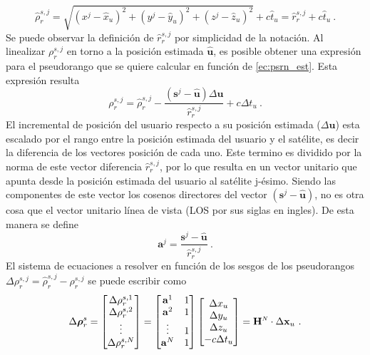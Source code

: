 \documentclass[a4paper,12pt,oneside,onecolumn,final,openright]{book}%
\begin{document}
\begin{equation}\label{ec:psrn_est}
	\hat{\rho}_r^{s,j} = \sqrt{(x^j-\hat{x}_u)^2+(y^j-\hat{y}_u)^2+(z^j-\hat{z}_u)^2} + c\hat{t}_u = \hat{r}_r^{s,j} + c\hat{t}_u \ .
\end{equation}
	Se puede observar la definición de $\hat{r}_r^{s,j}$ por simplicidad de la notación. Al linealizar $\rho_r^{s,j}$ en torno a la posición estimada $\hat{\mathbf{u}}$, es posible obtener una expresión para el pseudorango que se quiere calcular en función de \eqref{ec:psrn_est}. Esta expresión resulta
\begin{equation}
	\rho_r^{s,j} = \hat{\rho}_r^{s,j} - \dfrac{(\mathbf{s}^j - \hat{\mathbf{u}})\Delta \mathbf{u}}{\hat{r}_r^{s,j}} + c\Delta t_u \ .
\end{equation}
	El incremental de posición del usuario respecto a su posición estimada ($\Delta \mathbf{u}$) esta escalado por el rango entre la posición estimada del usuario y el satélite, es decir la diferencia de los vectores posición de cada uno. Este termino es dividido por la norma de este vector diferencia $\hat{r}_r^{s,j}$, por lo que resulta en un vector unitario que apunta desde la posición estimada del usuario al satélite j-ésimo. Siendo las componentes de este vector los cosenos directores del vector $(\mathbf{s}^j - \hat{\mathbf{u}})$, no es otra cosa que el vector unitario línea de vista (LOS por sus siglas en ingles). De esta manera se define
\begin{equation}\label{ec:uLOS}
	\mathbf{a}^j = \dfrac{\mathbf{s}^j-\hat{\mathbf{u}}}{\hat{r}_r^{s,j}} \ .
\end{equation}	
	El sistema de ecuaciones a resolver en función de los sesgos de los pseudorangos $\Delta\rho_r^{s,j} = \hat{\rho}_r^{s,j}-\rho_r^{s,j}$ se puede escribir como
\begin{equation}
	\Delta \boldsymbol{\rho}_r^s = \begin{bmatrix}
\Delta \rho_r^{s,1} \\
\Delta \rho_r^{s,2} \\
\vdots \\
\Delta \rho_r^{s,N} 
\end{bmatrix} = \begin{bmatrix}
\mathbf{a}^1 & 1 \\
\mathbf{a}^2 & 1 \\
\vdots & 1 \\
\mathbf{a}^N & 1 
\end{bmatrix} \begin{bmatrix}
\Delta x_u \\
\Delta y_u \\
\Delta z_u \\
-c\Delta t_u 
\end{bmatrix} = \mathbf{H}^{\scaleto{N}{4pt}}\cdot \Delta \mathbf{x}_u \ .
\end{equation}
\end{document}
